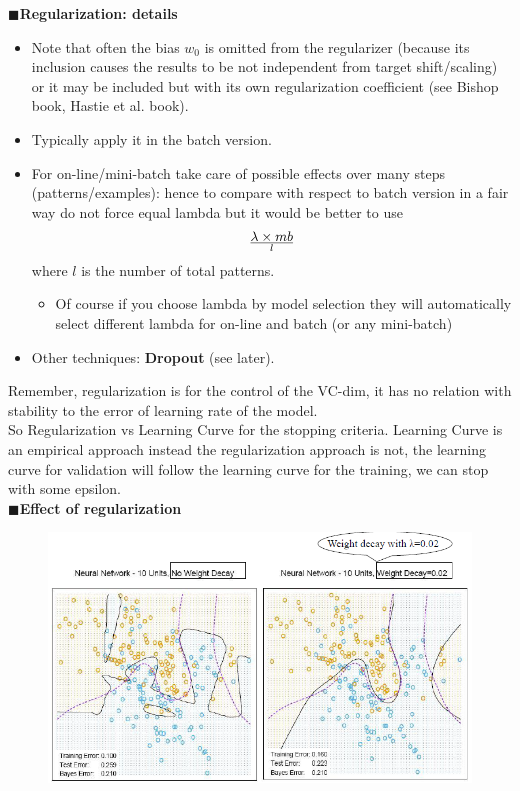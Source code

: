 \documentclass[../main.tex]{subfiles}
\begin{document}
$\blacksquare$\textbf{Regularization: details}
\begin{itemize}
    \item Note that often the bias $w_0$ is omitted from the regularizer (because its inclusion causes the results to be not independent from target shift/scaling) or it may be included but with its own regularization coefficient (see Bishop book, Hastie et al. book).
    \item Typically apply it in the batch version.
    \item For on-line/mini-batch take care of possible effects over many steps (patterns/examples): hence to compare with respect to batch version in a fair way do not force equal lambda but it would be better to use
    $$\lambda \times mb \over{l}$$
    where $l$ is the number of total patterns.
    \begin{itemize}
        \item Of course if you choose lambda by model selection they will automatically select different lambda for on-line and batch (or any mini-batch)
    \end{itemize}
    \item Other techniques: \textbf{Dropout} (see later).
\end{itemize}
Remember, regularization is for the control of the VC-dim, it has no relation with stability to the error of learning rate of the model.\\
So Regularization vs Learning Curve for the stopping criteria. Learning Curve is an empirical approach instead the regularization approach is not, the learning curve for validation will follow the learning curve for the training, we can stop with some epsilon.\\

$\blacksquare$\textbf{Effect of regularization}
\begin{figure}[H]
    \centering
    \includegraphics[scale = 0.7]{lectures/4_neural_networks/4_reg_effects.png}
    \label{fig:4_reg_effects}
\end{figure}
\end{document}
